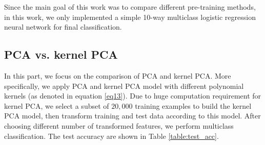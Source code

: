 \documentclass[tikz, multi,dvipsnames,svgnames,x11names]{article}
\begin{document}
Since the main goal of this work was to compare different pre-training methods, in this work, we only implemented a simple 10-way multiclass logistic regression neural network for final classification.

\subsection{PCA vs. kernel PCA}
\label{pca-kpca}

In this part, we focus on the comparison of PCA and kernel PCA. More specifically, we apply PCA and kernel PCA model with different polynomial kernels (as denoted in equation \ref{eq13}). Due to huge computation requirement for kernel PCA, we select a subset of $20,000$ training examples to build the kernel PCA model, then transform training and test data according to this model. After choosing different number of transformed features, we perform multiclass classification. The test accuracy are shown in Table \ref{table:test_acc}.

\end{document}

